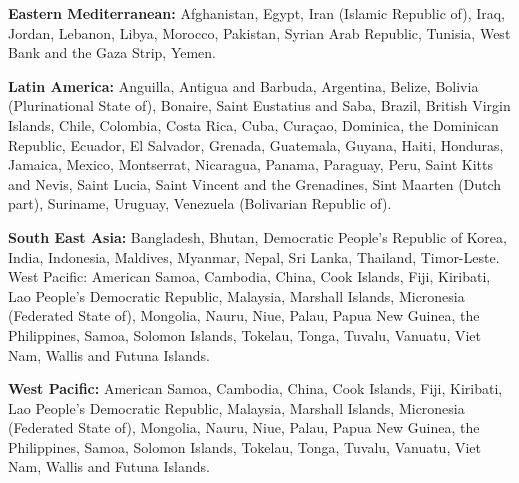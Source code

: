 \textbf{Eastern Mediterranean:} Afghanistan, Egypt, Iran (Islamic Republic of), Iraq, Jordan, Lebanon, Libya, Morocco, Pakistan, Syrian Arab Republic, Tunisia, West Bank and the Gaza Strip, Yemen. 

\textbf{Latin America:} Anguilla, Antigua and Barbuda, Argentina, Belize, Bolivia (Plurinational State of), Bonaire, Saint Eustatius and Saba, Brazil, British Virgin Islands, Chile, Colombia, Costa Rica, Cuba, Curaçao, Dominica, the Dominican Republic, Ecuador, El Salvador, Grenada, Guatemala, Guyana, Haiti, Honduras, Jamaica, Mexico, Montserrat, Nicaragua, Panama, Paraguay, Peru, Saint Kitts and Nevis, Saint Lucia, Saint Vincent and the Grenadines, Sint Maarten (Dutch part), Suriname, Uruguay, Venezuela (Bolivarian Republic of).

\textbf{South East Asia:} Bangladesh, Bhutan, Democratic People’s Republic of Korea, India, Indonesia, Maldives, Myanmar, Nepal, Sri Lanka, Thailand, Timor-Leste.
West Pacific: American Samoa, Cambodia, China, Cook Islands, Fiji, Kiribati, Lao People’s Democratic Republic, Malaysia, Marshall Islands, Micronesia (Federated State of), Mongolia, Nauru, Niue, Palau, Papua New Guinea, the Philippines, Samoa, Solomon Islands, Tokelau, Tonga, Tuvalu, Vanuatu, Viet Nam, Wallis and Futuna Islands. 

\textbf{West Pacific:} American Samoa, Cambodia, China, Cook Islands, Fiji, Kiribati, Lao People’s Democratic Republic, Malaysia, Marshall Islands, Micronesia (Federated State of), Mongolia, Nauru, Niue, Palau, Papua New Guinea, the Philippines, Samoa, Solomon Islands, Tokelau, Tonga, Tuvalu, Vanuatu, Viet Nam, Wallis and Futuna Islands. 
